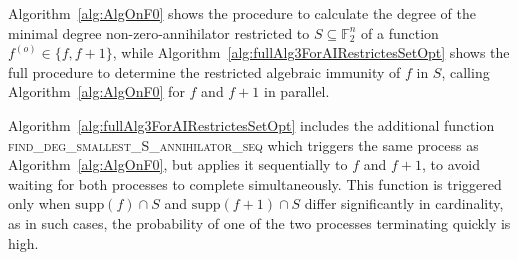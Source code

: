\documentclass[11pt]{llncs}
\begin{document}
Algorithm~\ref{alg:AlgOnF0} shows the procedure to calculate the degree of the minimal degree non-zero-annihilator 
restricted to $S\subseteq \mathbb{F}_2^n$ of a function $f^{(o)} \in \{f, f+ 1\}$, while Algorithm~\ref{alg:fullAlg3ForAIRestrictesSetOpt} shows the full procedure to determine the restricted algebraic immunity of $f$ in $S$, calling Algorithm~\ref{alg:AlgOnF0} for $f$ and $f+ 1$ in parallel.

Algorithm~\ref{alg:fullAlg3ForAIRestrictesSetOpt} includes the additional function \textsc{find\_deg\_smallest\_S\_annihilator\_seq} which triggers the same process as Algorithm~\ref{alg:AlgOnF0}, but applies it sequentially to $f$ and $f + 1$, to avoid waiting for both processes to complete simultaneously. This function is triggered only when $\mathrm{supp}(f) \cap S$ and $\mathrm{supp}(f + 1) \cap S$ differ significantly in cardinality, as in such cases, the probability of one of the two processes terminating quickly is high.
\end{document}
